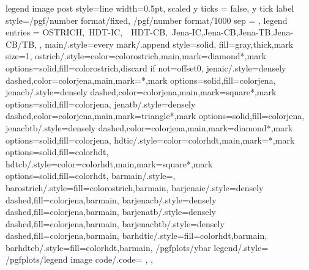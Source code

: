 {{      legend image post style={line width=0.5pt},
      scaled y ticks = false,
      y tick label style={/pgf/number format/fixed, /pgf/number format/1000 sep = \thinspace},
      legend entries = {OSTRICH,\ HDT-IC,\ \ HDT-CB,\ Jena-IC,Jena-CB,Jena-TB,Jena-CB/TB,}
  },
  main/.style={every mark/.append style={solid, fill=gray},thick,mark size=1},
  ostrich/.style={color=colorostrich,main,mark=diamond*,mark options={solid,fill=colorostrich},discard if not={offset}{0}},
  jenaic/.style={densely dashed,color=colorjena,main,mark=*,mark options={solid,fill=colorjena}},
  jenacb/.style={densely dashed,color=colorjena,main,mark=square*,mark options={solid,fill=colorjena}},
  jenatb/.style={densely dashed,color=colorjena,main,mark=triangle*,mark options={solid,fill=colorjena}},
  jenacbtb/.style={densely dashed,color=colorjena,main,mark=diamond*,mark options={solid,fill=colorjena}},
  hdtic/.style={color=colorhdt,main,mark=*,mark options={solid,fill=colorhdt}},
  hdtcb/.style={color=colorhdt,main,mark=square*,mark options={solid,fill=colorhdt}},
  barmain/.style={},
  barostrich/.style={fill=colorostrich,barmain},
  barjenaic/.style={densely dashed,fill=colorjena,barmain},
  barjenacb/.style={densely dashed,fill=colorjena,barmain},
  barjenatb/.style={densely dashed,fill=colorjena,barmain},
  barjenacbtb/.style={densely dashed,fill=colorjena,barmain},
  barhdtic/.style={fill=colorhdt,barmain},
  barhdtcb/.style={fill=colorhdt,barmain},
  /pgfplots/ybar legend/.style={
      /pgfplots/legend image code/.code={%
         },
  },
}
